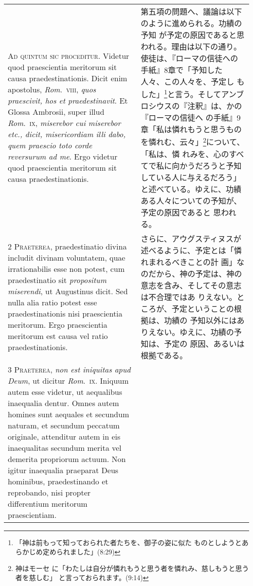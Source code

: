 \documentclass[10pt]{jsarticle} %
\begin{document}
\begin{longtable}{p{21em}p{21em}}


{\Huge A}{\scshape d quintum sic proceditur}. Videtur quod
praescientia meritorum sit causa praedestinationis. Dicit enim
apostolus, {\itshape Rom}.~{\scshape viii}, {\itshape quos praescivit, hos et praedestinavit}. Et Glossa
Ambrosii, super illud {\itshape Rom}.~{\scshape ix}, {\itshape miserebor cui miserebor etc., dicit,
misericordiam illi dabo, quem praescio toto corde reversurum ad me}. Ergo
videtur quod praescientia meritorum sit causa praedestinationis.


&

第五項の問題へ、議論は以下のように進められる。功績の予知
 が予定の原因であると思われる。理由は以下の通り。
使徒は、『ローマの信徒への手紙』8章で「予知した人々、この人々を、予定し
 もした」\footnote{「神は前もって知っておられた者たちを、御子の姿に似た
 ものとしようとあらかじめ定められました」(8:29)}と言う。そしてアンブロシウスの『注釈』は、かの『ローマの信徒へ
 の手紙』9章「私は憐れもうと思うものを憐れむ、云々」\footnote{神はモーセ
 に「わたしは自分が憐れもうと思う者を憐れみ、慈しもうと思う者を慈しむ」
 と言っておられます。(9:14)}について、「私は、憐
 れみを、心のすべてで私に向かうだろうと予知している人に与えるだろう」
 と述べている。ゆえに、功績ある人々についての予知が、予定の原因であると
 思われる。



\\


{\scshape 2 Praeterea}, praedestinatio divina includit
divinam voluntatem, quae irrationabilis esse non potest, cum
praedestinatio sit {\itshape propositum miserendi}, ut Augustinus dicit. Sed nulla
alia ratio potest esse praedestinationis nisi praescientia
meritorum. Ergo praescientia meritorum est causa vel ratio
praedestinationis.


&

さらに、アウグスティヌスが述べるように、予定とは「憐れまれるべきことの計
 画」なのだから、神の予定は、神の意志を含み、そしてその意志は不合理ではあ
 りえない。ところが、予定ということの根拠は、功績の
 予知以外にはありえない。ゆえに、功績の予知は、予定の
 原因、あるいは根拠である。


\\


{\scshape 3 Praeterea}, {\itshape non est iniquitas apud Deum}, ut
dicitur {\itshape Rom}.~{\scshape ix}. Iniquum autem esse videtur, ut aequalibus inaequalia
dentur. Omnes autem homines sunt aequales et secundum naturam, et
secundum peccatum originale, attenditur autem in eis inaequalitas
secundum merita vel demerita propriorum actuum. Non igitur inaequalia
praeparat Deus hominibus, praedestinando et reprobando, nisi propter
differentium meritorum praescientiam.



\end{longtable}
\end{document}
